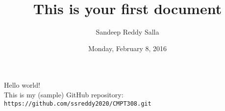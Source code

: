 \documentclass{article}
\title{This is your first document}
\author{Sandeep Reddy Salla}
\date{Monday, February 8, 2016}
\begin{document}
	\maketitle
	Hello world! \\
	This is my (sample) GitHub repository: {\tt https://github.com/ssreddy2020/CMPT308.git}
\end{document}
